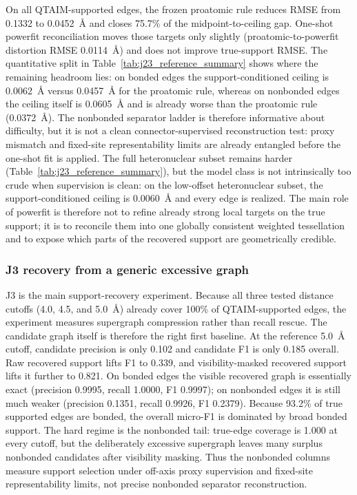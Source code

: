 \documentclass[preprint,12pt]{elsarticle}
\begin{document}
On all QTAIM-supported edges, the frozen proatomic rule reduces RMSE from
0.1332 to 0.0452~\AA{} and closes 75.7\% of the midpoint-to-ceiling gap.
One-shot powerfit reconciliation moves those targets only slightly
(proatomic-to-powerfit distortion RMSE 0.0114~\AA{}) and does not improve
true-support RMSE. The quantitative split in
Table~\ref{tab:j23_reference_summary} shows where the remaining headroom lies:
on bonded edges the support-conditioned ceiling is 0.0062~\AA{} versus
0.0457~\AA{} for the proatomic rule, whereas on nonbonded edges the ceiling
itself is 0.0605~\AA{} and is already worse than the proatomic rule
(0.0372~\AA{}). The nonbonded separator ladder is therefore informative about
difficulty, but it is not a clean connector-supervised reconstruction test:
proxy mismatch and fixed-site representability limits are already entangled
before the one-shot fit is applied. The full heteronuclear subset remains
harder (Table~\ref{tab:j23_reference_summary}), but the model class is not
intrinsically too crude when supervision is clean: on the low-offset
heteronuclear subset, the support-conditioned ceiling is 0.0060~\AA{} and every
edge is realized. The main role of powerfit is therefore not to refine already
strong local targets on the true support; it is to reconcile them into one
globally consistent weighted tessellation and to expose which parts of the
recovered support are geometrically credible.


\subsubsection{J3 recovery from a generic excessive graph}
J3 is the main support-recovery experiment. Because all three tested distance
cutoffs (4.0, 4.5, and 5.0~\AA{}) already cover 100\% of QTAIM-supported
edges, the experiment measures supergraph compression rather than recall
rescue. The candidate graph itself is therefore the right first baseline. At
the reference 5.0~\AA{} cutoff,
candidate precision is only 0.102 and candidate F1 is only 0.185 overall. Raw
recovered support lifts F1 to 0.339, and visibility-masked recovered support
lifts it further to 0.821. On bonded edges the visible recovered graph is
essentially exact (precision 0.9995, recall 1.0000, F1 0.9997); on nonbonded
edges it is still much weaker (precision 0.1351, recall 0.9926, F1 0.2379).
Because 93.2\% of true supported edges are bonded, the overall micro-F1 is
dominated by broad bonded support. The hard regime is the nonbonded tail:
true-edge coverage is 1.000 at every cutoff, but the deliberately excessive
supergraph leaves many surplus nonbonded candidates after visibility masking.
Thus the nonbonded columns measure support selection under off-axis proxy
supervision and fixed-site representability limits, not precise nonbonded
separator reconstruction.
\end{document}
